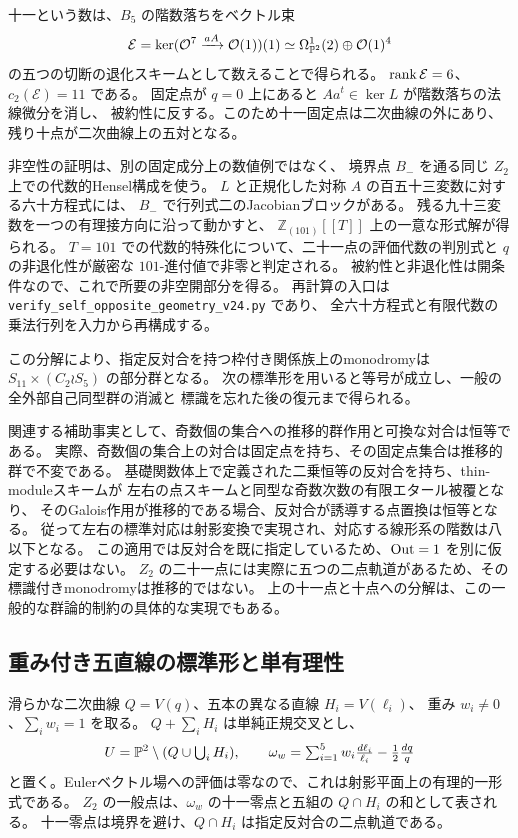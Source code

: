 十一という数は、$B_5$ の階数落ちをベクトル束
\[
 \mathcal E=\ker(\mathcal O^{7}\xrightarrow{aA}\mathcal O(1))(1)
 \simeq\Omega^1_{\mathbb P^2}(2)\oplus\mathcal O(1)^4
\]
の五つの切断の退化スキームとして数えることで得られる。
$\operatorname{rank}\mathcal E=6$、$c_2(\mathcal E)=11$ である。
固定点が $q=0$ 上にあると $Aa^t\in\ker L$ が階数落ちの法線微分を消し、
被約性に反する。このため十一固定点は二次曲線の外にあり、
残り十点が二次曲線上の五対となる\cite{PaperII}。

非空性の証明は、別の固定成分上の数値例ではなく、
境界点 $B_-$ を通る同じ $Z_2$ 上での代数的Hensel構成を使う。
$L$ と正規化した対称 $A$ の百五十三変数に対する六十方程式には、
$B_-$ で行列式二のJacobianブロックがある。
残る九十三変数を一つの有理接方向に沿って動かすと、
$\mathbb Z_{(101)}[[T]]$ 上の一意な形式解が得られる。
$T=101$ での代数的特殊化について、二十一点の評価代数の判別式と
$q$ の非退化性が厳密な $101$-進付値で非零と判定される。
被約性と非退化性は開条件なので、これで所要の非空開部分を得る。
再計算の入口は \nolinkurl{verify_self_opposite_geometry_v24.py} であり、
全六十方程式と有限代数の乗法行列を入力から再構成する。

この分解により、指定反対合を持つ枠付き関係族上のmonodromyは
$S_{11}\times(C_2\wr S_5)$ の部分群となる。
次の標準形を用いると等号が成立し、一般の全外部自己同型群の消滅と
標識を忘れた後の復元まで得られる。

関連する補助事実として、奇数個の集合への推移的群作用と可換な対合は恒等である。
実際、奇数個の集合上の対合は固定点を持ち、その固定点集合は推移的群で不変である。
基礎関数体上で定義された二乗恒等の反対合を持ち、thin-moduleスキームが
左右の点スキームと同型な奇数次数の有限エタール被覆となり、
そのGalois作用が推移的である場合、反対合が誘導する点置換は恒等となる。
従って左右の標準対応は射影変換で実現され、対応する線形系の階数は八以下となる。
この適用では反対合を既に指定しているため、$\operatorname{Out}=1$ を別に仮定する必要はない。
$Z_2$ の二十一点には実際に五つの二点軌道があるため、その標識付きmonodromyは推移的ではない。
上の十一点と十点への分解は、この一般的な群論的制約の具体的な実現でもある。

\subsection{重み付き五直線の標準形と単有理性}
滑らかな二次曲線 $Q=V(q)$、五本の異なる直線 $H_i=V(\ell_i)$、
重み $w_i\ne0$、$\sum_iw_i=1$ を取る。
$Q+\sum_iH_i$ は単純正規交叉とし、
\[
 U=\mathbb P^2\setminus(Q\cup\textstyle\bigcup_iH_i),\qquad
 \omega_w=\sum_{i=1}^5w_i\frac{d\ell_i}{\ell_i}-\frac12\frac{dq}{q}
\]
と置く。Eulerベクトル場への評価は零なので、これは射影平面上の有理的一形式である。
$Z_2$ の一般点は、$\omega_w$ の十一零点と五組の $Q\cap H_i$ の和として表される。
十一零点は境界を避け、$Q\cap H_i$ は指定反対合の二点軌道である。

